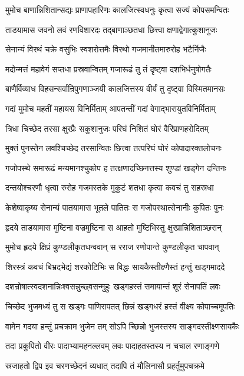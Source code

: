 \twolineshloka
{मुमोच बाणान्निशितान्सद्यः प्राणापहारिणः}
{कालजित्स्वधनुः कृत्वा सज्यं कोपसमन्वितः}%

\twolineshloka
{ताडयामास जवनो लवं रणविशारदः}
{तद्बाणाञ्छतधा छित्त्वा क्षणाद्वेगात्कुशानुजः}%

\twolineshloka
{सेनान्यं विरथं चक्रे वसुभिः स्वशरोत्तमैः}
{विरथो गजमानीतमारुरोह भटैर्निजैः}%

\twolineshloka
{मदोन्मत्तं महावेगं सप्तधा प्रस्रवान्वितम्}
{गजारूढं तु तं दृष्ट्वा दशभिर्धनुषोगतैः}%

\twolineshloka
{बाणैर्विव्याध विहसन्सर्वान्रिपुगणाञ्जयी}
{कालजित्तस्य वीर्यं तु दृष्ट्वा विस्मितमानसः}%

\twolineshloka
{गदां मुमोच महतीं महायस विनिर्मिताम्}
{आपतन्तीं गदां वेगाद्भारायुतविनिर्मिताम्}%

\twolineshloka
{त्रिधा चिच्छेद तरसा क्षुरप्रैः सकुशानुजः}
{परिघं निशितं घोरं वैरिप्राणहरोदितम्}%

\twolineshloka
{मुक्तं पुनस्तेन लवश्चिच्छेद तरसान्वितः}
{छित्त्वा तत्परिघं घोरं कोपादारक्तलोचनः}%

\twolineshloka
{गजोपस्थे समारूढं मन्यमानश्चुकोप ह}
{तत्क्षणादच्छिनत्तस्य शुण्डां खड्गेन दन्तिनः}%

\twolineshloka
{दन्तयोश्चरणौ धृत्वा रुरोह गजमस्तके}
{मुकुटं शतधा कृत्वा कवचं तु सहस्रधा}%

\twolineshloka
{केशेष्वाकृष्य सेनान्यं पातयामास भूतले}
{पातितः स गजोपस्थात्सेनानीः कुपितः पुनः}%

\twolineshloka
{हृदये ताडयामास मुष्टिना वज्रमुष्टिना}
{स आहतो मुष्टिभिस्तु क्षुरप्रान्निशिताञ्छरान्}%

\twolineshloka
{मुमोच हृदये क्षिप्रं कुण्डलीकृतधन्ववान्}
{स रराज रणोपान्ते कुण्डलीकृत चापवान्}%

\twolineshloka
{शिरस्त्रं कवचं बिभ्रदभेद्यं शरकोटिभिः}
{स विद्धः सायकैस्तीक्ष्णैस्तं हन्तुं खड्गमाददे}%

\twolineshloka
{दशन्रोषात्स्वदशनान्निःश्वसन्नुच्छ्वसन्मुहुः}
{खड्गहस्तं समायान्तं शूरं सेनापतिं लवः}%

\twolineshloka
{चिच्छेद भुजमध्यं तु स खड्गः पाणिरापतत्}
{छिन्नं खड्गधरं हस्तं वीक्ष्य कोपाच्चमूपतिः}%

\twolineshloka
{वामेन गदया हन्तुं प्रचक्राम भुजेन तम्}
{सोऽपि च्छिन्नो भुजस्तस्य साङ्गदस्तीक्ष्णसायकैः}%

\twolineshloka
{तदा प्रकुपितो वीरः पादाभ्यामहनल्लवम्}
{लवः पादाहतस्तस्य न चचाल रणाङ्गणे}%

\twolineshloka
{स्रजाहतो द्विप इव चरणच्छेदनं व्यधात्}
{तदापि तं मौलिनासौ प्रहर्तुमुपचक्रमे}%

